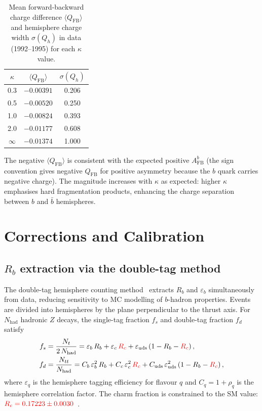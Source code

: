 \documentclass[11pt,a4paper]{article}
\newcommand{\external}[1]{\textcolor{red}{#1}}
\begin{document}
\begin{table}[htbp]
\centering
\caption{Mean forward-backward charge difference $\langle Q_\text{FB}\rangle$
and hemisphere charge width $\sigma(Q_h)$ in data (1992--1995) for
each $\kappa$ value.}
\label{tbl:qfb}
\begin{tabular}{ccc}
\toprule
$\kappa$ & $\langle Q_\text{FB}\rangle$ & $\sigma(Q_h)$ \\
\midrule
0.3     & $-0.00391$ & 0.206 \\
0.5     & $-0.00520$ & 0.250 \\
1.0     & $-0.00824$ & 0.393 \\
2.0     & $-0.01177$ & 0.608 \\
$\infty$& $-0.01374$ & 1.000 \\
\bottomrule
\end{tabular}
\end{table}

The negative $\langle Q_\text{FB}\rangle$ is consistent with the
expected positive $A_\text{FB}^b$ (the sign convention gives
negative $Q_\text{FB}$ for positive asymmetry because the $b$
quark carries negative charge).
The magnitude increases with $\kappa$ as expected: higher $\kappa$
emphasises hard fragmentation products, enhancing the charge
separation between $b$ and $\bar{b}$ hemispheres.

\section{Corrections and Calibration}
\label{sec:corrections}

\subsection{$R_b$ extraction via the double-tag method}
\label{sec:corrections:Rb}

The double-tag hemisphere counting method~\cite{LEP:HF:2001,ALEPH:Rb:1996}
extracts $R_b$ and $\varepsilon_b$ simultaneously from data,
reducing sensitivity to MC modelling of $b$-hadron properties.
Events are divided into hemispheres by the plane perpendicular to
the thrust axis.
For $N_\text{had}$ hadronic $Z$ decays, the single-tag fraction
$f_s$ and double-tag fraction $f_d$ satisfy
\begin{align}
f_s &= \frac{N_t}{2\,N_\text{had}} = \varepsilon_b\,R_b +
  \varepsilon_c\,\external{R_c} +
  \varepsilon_\text{uds}\,(1 - R_b - \external{R_c})\,,
\label{eq:fs} \\
f_d &= \frac{N_{tt}}{N_\text{had}} =
  C_b\,\varepsilon_b^2\,R_b +
  C_c\,\varepsilon_c^2\,\external{R_c} +
  C_\text{uds}\,\varepsilon_\text{uds}^2\,
  (1 - R_b - \external{R_c})\,,
\label{eq:fd}
\end{align}
where $\varepsilon_q$ is the hemisphere tagging efficiency for
flavour $q$ and $C_q = 1 + \rho_q$ is the hemisphere correlation
factor.
The charm fraction is constrained to the SM value:
$\external{R_c = 0.17223 \pm 0.0030}$~\cite{LEP:EWWG:2005}.
\end{document}
